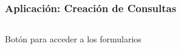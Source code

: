 \documentclass[14pt]{beamer}
\begin{document}
\begin{frame}
\frametitle{Aplicación: Creación de Consultas}

\begin{columns}

\begin{column}{0.3\textwidth}
\begin{center}

\begin{small}
\caption{Botón para acceder a los formularios}
\end{small}
\end{center}
\end{column}


\begin{column}{0.3\textwidth}
\begin{center}


\end{center}
\end{column}
\end{columns}
\end{frame}
\end{document}

